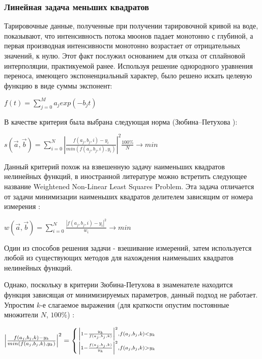 \documentclass[a4paper,10pt]{article}
\begin{document}
\subsubsection{Линейная задача меньших квадратов}





Тарировочные данные, полученные при получении тарировочной кривой на воде, показывают, что интенсивность потока мюонов падает монотонно с
глубиной, а первая производная интенсивности монотонно возрастает от отрицательных значений, к нулю. Этот факт послужил основанием для отказа 
от сплайновой интерполяции, практикуемой ранее. Используя решение однородного уравнения переноса, имеющего экспоненциальный характер, было решено
искать целевую функцию в виде суммы экспонент:
\begin{center}
$\mathit{ f(t)  = \displaystyle\sum_{j=0}^M a_j exp(-b_j t) }$ 
\end{center}



В качестве критерия была выбрана следующая норма (Зюбина--Петухова ): 
\begin{center}

$s(\vec{a}, \vec{b}) = \displaystyle\sum_{i=0}^N \left|\frac{f(a_j, b_j, i) - y_i}{min(f(a_j, b_j, i), y_i)}\right|^2 \frac{100\%}{N} \rightarrow min$ %

\end{center}
Данный критерий похож на взвешенную задачу наименьших квадратов нелинейных функций, в иностранной литературе можно встретить следующее название 
Weightened Non-Linear Least Squares Problem. Эта задача отличается от задачи минимизации наименьших квадратов делителем зависящим от номера измерения : 
\begin{center}
$w(\vec{a}, \vec{b}) = \displaystyle\sum_{i=0}^N \frac{\left|f(a_j, b_j, i) - y_i\right|^2}{w_i} \rightarrow min$
\end{center}
Один из способов решения задачи - взешивание измерений, затем используется любой из существующих методов для нахождения наименьших квадратов нелинейных функций.


Однако, поскольку в критерии Зюбина-Петухова в знаменателе находится функция зависящая от минимизируемых параметров, данный подход не работает. Упростим $k$-е слагаемое выражения %
(для краткости опустим постоянные множители $N$, $100\%$) : 

\begin{center}
 \LARGE{$ \left|\frac{f(a_j, b_j, k) - y_k}{min(f(a_j, b_j, k), y_k)}\right|^2 = \left\{ {
    \left| 1 - \frac{y_k}{f(a_j, b_j, k)}\right|^2 , f(a_j, b_j, k) < y_k  \atop 
    \left| 1 - \frac{f(a_j, b_j, k)}{y_k}\right|^2 , f(a_j, b_j, k) > y_k  
 } \right. $}
\end{center}
\end{document}
